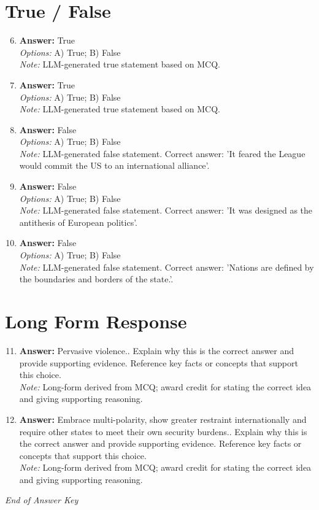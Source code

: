 \documentclass[12pt]{article}
\begin{document}
\section*{True / False}
\begin{enumerate}[label=\arabic*.]
\setcounter{enumi}{5}
\item \textbf{Answer:} True
\\ \textit{Options:} A) True; B) False
\\ \textit{Note:} LLM-generated true statement based on MCQ.
\item \textbf{Answer:} True
\\ \textit{Options:} A) True; B) False
\\ \textit{Note:} LLM-generated true statement based on MCQ.
\item \textbf{Answer:} False
\\ \textit{Options:} A) True; B) False
\\ \textit{Note:} LLM-generated false statement. Correct answer: 'It feared the League would commit the US to an international alliance'.
\item \textbf{Answer:} False
\\ \textit{Options:} A) True; B) False
\\ \textit{Note:} LLM-generated false statement. Correct answer: 'It was designed as the antithesis of European politics'.
\item \textbf{Answer:} False
\\ \textit{Options:} A) True; B) False
\\ \textit{Note:} LLM-generated false statement. Correct answer: 'Nations are defined by the boundaries and borders of the state.'.
\end{enumerate}

\section*{Long Form Response}
\begin{enumerate}[label=\arabic*.]
\setcounter{enumi}{10}
\item \textbf{Answer:} Pervasive violence.. Explain why this is the correct answer and provide supporting evidence. Reference key facts or concepts that support this choice.
\\ \textit{Note:} Long-form derived from MCQ; award credit for stating the correct idea and giving supporting reasoning.
\item \textbf{Answer:} Embrace multi-polarity, show greater restraint internationally and require other states to meet their own security burdens.. Explain why this is the correct answer and provide supporting evidence. Reference key facts or concepts that support this choice.
\\ \textit{Note:} Long-form derived from MCQ; award credit for stating the correct idea and giving supporting reasoning.
\end{enumerate}

\vfill
\noindent\textit{End of Answer Key}
\end{document}
